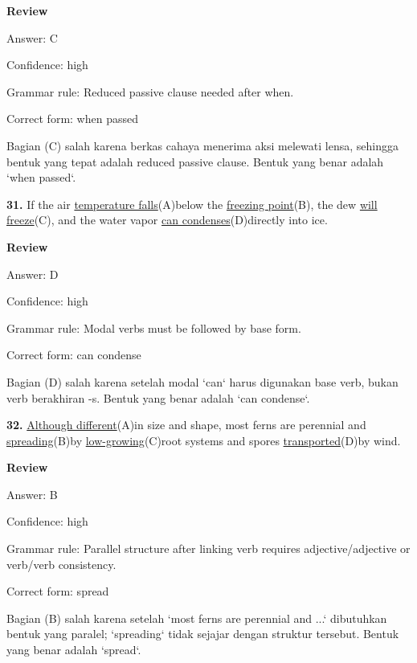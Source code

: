 \documentclass[12pt]{article}
\begin{document}
\begingroup
\setlength{\parskip}{0pt}
\setlength{\parindent}{0pt}
\textbf{Review}\par
Answer: C\par
Confidence: high\par
Grammar rule: Reduced passive clause needed after when.\par
Correct form: when passed\par
Bagian (C) salah karena berkas cahaya menerima aksi melewati lensa, sehingga bentuk yang tepat adalah reduced passive clause. Bentuk yang benar adalah `when passed`.\par
\endgroup
\par
\vspace{\questionblockgap}
\noindent\textbf{31.} If the air \uline{temperature falls}(A)below the \uline{freezing point}(B), the dew \uline{will freeze}(C), and the water vapor \uline{can condenses}(D)directly into ice.
\par
\begingroup
\setlength{\parskip}{0pt}
\setlength{\parindent}{0pt}
\textbf{Review}\par
Answer: D\par
Confidence: high\par
Grammar rule: Modal verbs must be followed by base form.\par
Correct form: can condense\par
Bagian (D) salah karena setelah modal `can` harus digunakan base verb, bukan verb berakhiran -s. Bentuk yang benar adalah `can condense`.\par
\endgroup
\par
\vspace{\questionblockgap}
\noindent\textbf{32.} \uline{Although different}(A)in size and shape, most ferns are perennial and \uline{spreading}(B)by \uline{low-growing}(C)root systems and spores \uline{transported}(D)by wind.
\par
\begingroup
\setlength{\parskip}{0pt}
\setlength{\parindent}{0pt}
\textbf{Review}\par
Answer: B\par
Confidence: high\par
Grammar rule: Parallel structure after linking verb requires adjective/adjective or verb/verb consistency.\par
Correct form: spread\par
Bagian (B) salah karena setelah `most ferns are perennial and ...` dibutuhkan bentuk yang paralel; `spreading` tidak sejajar dengan struktur tersebut. Bentuk yang benar adalah `spread`.\par
\end{document}
